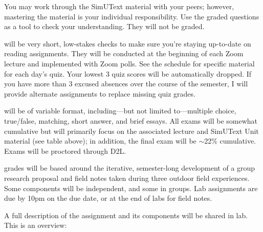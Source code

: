 \documentclass{tufte-handout}
\begin{document}
\begin{fullwidth}

You may work through the SimUText material with your peers; however, mastering the material is your individual responsibility. Use the graded questions as a tool to check your understanding. They will not be graded. 

 will be very short, low-stakes checks to make sure you're staying up-to-date on reading assignments. They will be conducted at the beginning of each Zoom lecture and implemented with Zoom polls. See the schedule for specific material for each day's quiz. Your lowest 3 quiz scores will be automatically dropped. If you have more than 3 excused absences over the course of the semester, I will provide alternate assignments to replace missing quiz grades.

 will be of variable format, including---but not limited to---multiple choice, true/false, matching, short answer, and brief essays. All exams will be somewhat cumulative but will primarily focus on the associated lecture and SimUText Unit material (see table above); in addition, the final exam will be $\sim$22\% cumulative. Exams will be proctored through D2L.



 grades will be based around the iterative, semester-long development of a group research proposal and field notes taken during three outdoor field experiences.  Some components will be independent, and some in groups. Lab assignments are  due by 10pm on the due date, or at the end of labs for field notes. 

A full description of the assignment and its components will be shared in lab. This is an overview:


\end{fullwidth}
\end{document}

